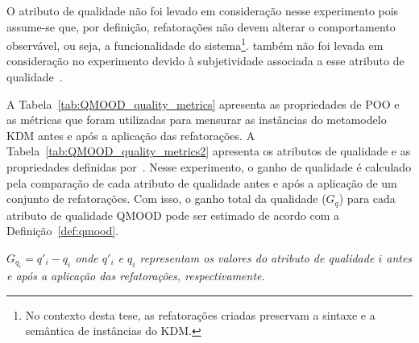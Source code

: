 O atributo de qualidade  não foi levado em consideração nesse experimento pois assume-se que, por definição, refatorações não devem alterar o comportamento observável, ou seja, a funcionalidade do sistema\footnote{No contexto desta tese, as refatorações criadas preservam a sintaxe e a semântica de instâncias do KDM.}.  também não foi levada em consideração no experimento devido à subjetividade associada a esse atributo de qualidade~\cite{Bansiya_QMOOD}.



A Tabela~\ref{tab:QMOOD_quality_metrics} apresenta as propriedades de POO e as métricas que foram utilizadas para mensurar as instâncias do metamodelo KDM antes e após a aplicação das refatorações. A Tabela~\ref{tab:QMOOD_quality_metrics2} apresenta os atributos de qualidade e as propriedades definidas por~. Nesse experimento, o ganho de qualidade é calculado pela comparação de cada atributo de qualidade antes e após a aplicação de um conjunto de refatorações. Com isso, o ganho total da qualidade ($G_{q}$) para cada atributo de qualidade QMOOD pode ser estimado de acordo com a Definição~\ref{def:qmood}.

\begin{definicao}\label{def:qmood}
    \textit{$G_{q_{i}} = q'_{i} - q_{i}$ onde $q'_{i}$ e $q_{i}$ representam os valores do atributo de qualidade $i$ antes e após a aplicação das refatorações, respectivamente.}
\end{definicao}

